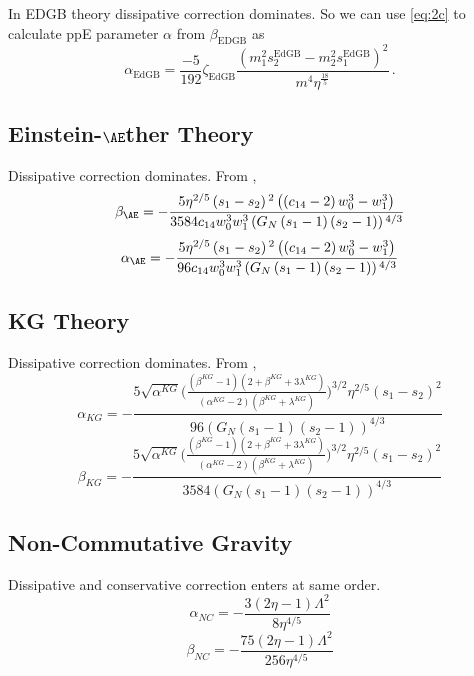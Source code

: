 \documentclass[11pt]{article}
\begin{document}
 \hspace{15.5pt} In EDGB theory dissipative correction dominates. So we can use \eqref{eq:2c} to calculate ppE parameter $\alpha$ from $\beta_{\text{EDGB}}$ as  
 \begin{equation}
 \alpha_{\text{EdGB}}=\frac{-5}{192}\zeta_{\text{EdGB}}\frac{(m_1^2s_2^{\text{EdGB}}-m_2^2s_1^{\text{EdGB}})^2}{m^4\eta^{\frac{18}{5}}}\,.
 \end{equation}
 
 
 
 \subsection{Einstein-$\AE$ther Theory}
 Dissipative correction dominates. From \cite{Hansen:2014ewa},
 \begin{equation}
 \beta_{\AE}=-\frac{5 \eta ^{2/5} \left(s_1-s_2\right){}^2 \left(\left(c_{14}-2\right) w_0^3-w_1^3\right)}{3584 c_{14} w_0^3 w_1^3 \left(\text{$G_N$} \left(s_1-1\right) \left(s_2-1\right)\right){}^{4/3}}
 \end{equation}
 \begin{equation}
 \alpha_{\AE}=-\frac{5 \eta ^{2/5} \left(s_1-s_2\right){}^2 \left(\left(c_{14}-2\right) w_0^3-w_1^3\right)}{96 c_{14} w_0^3 w_1^3 \left(\text{$G_N$} \left(s_1-1\right) \left(s_2-1\right)\right){}^{4/3}}
 \end{equation}
 
 \subsection{KG Theory}
 Dissipative correction dominates. From \cite{Hansen:2014ewa},
 \begin{equation}
 \alpha_{KG}=-\frac{5 \sqrt{\alpha^{KG}}\bigg(\frac{(\beta^{KG}-1)(2+\beta^{KG}+3\lambda^{KG})}{(\alpha^{KG}-2)(\beta^{KG}+\lambda^{KG})}\bigg)^{3/2}\eta ^{2/5} (\text{$s_1$}-\text{$s_2$})^2}{96 (\text{$G_N$} (\text{$s_1$}-1) (\text{$s_2$}-1))^{4/3}}
 \end{equation}
 \begin{equation}
 \beta_{KG}=-\frac{5 \sqrt{\alpha^{KG}}\bigg(\frac{(\beta^{KG}-1)(2+\beta^{KG}+3\lambda^{KG})}{(\alpha^{KG}-2)(\beta^{KG}+\lambda^{KG})}\bigg)^{3/2}\eta ^{2/5} (\text{$s_1$}-\text{$s_2$})^2}{3584(\text{$G_N$} (\text{$s_1$}-1) (\text{$s_2$}-1))^{4/3}}
 \end{equation}

 \subsection{Non-Commutative Gravity}
 Dissipative and conservative correction enters at same order. \cite{Kobakhidze:2016cqh}
 \begin{equation}
 \alpha_{NC}=-\frac{3 (2 \eta -1) \Lambda ^2}{8 \eta ^{4/5}}
 \end{equation}
 \begin{equation}
 \beta_{NC}=-\frac{75 (2 \eta -1) \Lambda ^2}{256 \eta ^{4/5}}
 \end{equation}
 \newpage
 
\end{document}
